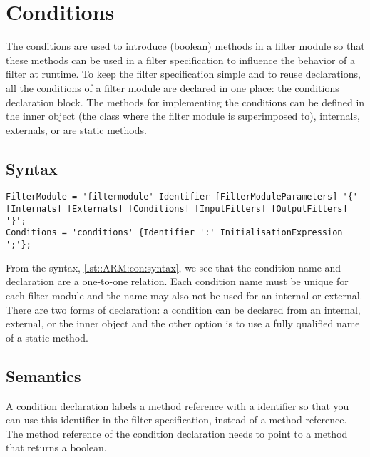 \chapter{Conditions} \label{ch::arm:con}
The conditions are used to introduce (boolean) methods in a filter module so that these methods can be used in a filter specification to influence the behavior of a filter at runtime. 
To keep the filter specification simple and to reuse declarations, all the conditions of a filter module are declared in one place: the conditions declaration block.
The methods for implementing the conditions can be defined in the inner object (the class where the filter module is superimposed to), internals, externals, or are static methods.

\section{Syntax}
\begin{lstlisting}[caption={Conditions syntax},label=lst::ARM:con:syntax,style=listing,language=ebnf,float=tpb]
FilterModule = 'filtermodule' Identifier [FilterModuleParameters] '{' [Internals] [Externals] [Conditions] [InputFilters] [OutputFilters] '}';
Conditions = 'conditions' {Identifier ':' InitialisationExpression ';'};
\end{lstlisting}
From the syntax, \autoref{lst::ARM:con:syntax}, we see that the condition name and declaration are a one-to-one relation. 
Each condition name must be unique for each filter module and the name may also not be used for an internal or external. 
There are two forms of declaration: a condition can be declared from an internal, external, or the inner object and the other option is to use a fully qualified name of a static method.

\section{Semantics}
A condition declaration labels a method reference with a identifier so that you can use this identifier in the filter specification, instead of a method reference. 
The method reference of the condition declaration needs to point to a method that returns a boolean.

